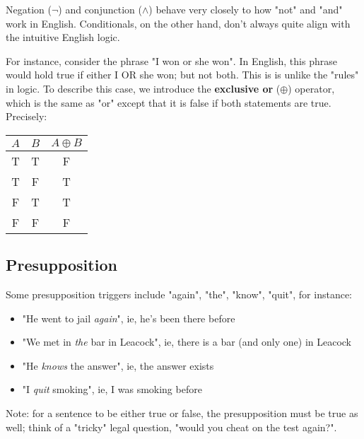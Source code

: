 \documentclass[12pt]{article}
\begin{document}
Negation ($\neg$) and conjunction ($\wedge$) behave very closely to how "not" and "and" work in English. Conditionals, on the other hand, don't always quite align with the intuitive English logic.

For instance, consider the phrase "I won or she won". In English, this phrase would hold true if either I OR she won; but not both. This is is unlike the "rules" in logic. To describe this case, we introduce the \textbf{exclusive or} ($\oplus$) operator, which is the same as "or" except that it is false if both statements are true. Precisely:

\begin{center}
  \begin{tabular}{c | c | c}
    $A$ & $B$ & $A \oplus B$ \\
    \hline
    T & T & F \\
    T & F & T \\
    F & T & T \\
    F & F & F
  \end{tabular}
\end{center}

\subsection{Presupposition}


Some presupposition triggers include "again", "the", "know", "quit", for instance: 
\begin{itemize}
  \item "He went to jail \textit{again}", ie, he's been there before
  \item "We met in \textit{the} bar in Leacock", ie, there is a bar (and only one) in Leacock
  \item "He \textit{knows} the answer", ie, the answer exists
  \item "I \textit{quit} smoking", ie, I was smoking before
\end{itemize}

Note: for a sentence to be either true or false, the presupposition must be true as well; think of a "tricky" legal question, "would you cheat on the test again?".
\end{document}
